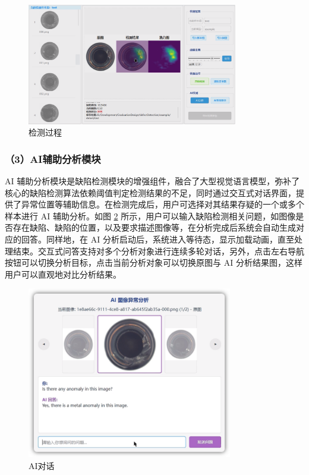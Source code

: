 \documentclass[
  ]{njuthesis}
\begin{document}
\begin{figure}[htb]
    \centering
    \includegraphics[width=0.82\textwidth]{images/检测过程.png}
    \caption{检测过程}
    \label{检测过程}
\end{figure}

\subsubsection{（3）AI辅助分析模块}

AI 辅助分析模块是缺陷检测模块的增强组件，融合了大型视觉语言模型，弥补了核心的缺陷检测算法依赖阈值判定检测结果的不足，同时通过交互式对话界面，提供了异常位置等辅助信息。在检测完成后，用户可选择对其结果存疑的一个或多个样本进行 AI 辅助分析。如图 \ref{AI对话} 所示，用户可以输入缺陷检测相关问题，如图像是否存在缺陷、缺陷的位置，以及要求描述图像等，在分析完成后系统会自动生成对应的回答。同样地，在 AI 分析启动后，系统进入等待态，显示加载动画，直至处理结束。交互式问答支持对多个分析对象进行连续多轮对话，另外，点击左右导航按钮可以切换分析目标，点击当前分析对象可以切换原图与 AI 分析结果图，这样用户可以直观地对比分析结果。

\begin{figure}[H]
    \centering
    \includegraphics[width=0.8\textwidth]{images/AI对话.png}
    \caption{AI对话}
    \label{AI对话}
\end{figure}
\end{document}
